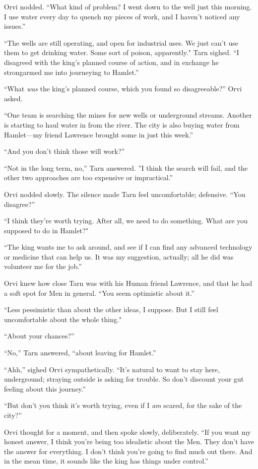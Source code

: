 Orvi nodded.  ``What kind of problem? I went down to the well just this morning.  I use water every day to quench my pieces of work, and I haven't noticed any issues.''

``The wells are still operating, and open for industrial uses.  We just can't use them to get drinking water.  Some sort of poison, apparently."  Tarn sighed.  ``I disagreed with the king's planned course of action, and in exchange he strongarmed me into journeying to Hamlet.''

``What \emph{was} the king's planned course, which you found so disagreeable?'' Orvi asked.

``One team is searching the mines for new wells or underground streams.  Another is starting to haul water in from the river.  The city is also buying water from Hamlet---my friend Lawrence brought some in just this week.''

``And you don't think those will work?''

``Not in the long term, no,'' Tarn answered.  ''I think the search will fail, and the other two approaches are too expensive or impractical.''

Orvi nodded slowly.  The silence made Tarn feel uncomfortable; defensive.  ``You disagree?''

``I think they're worth trying.  After all, we need to do something.  What are you supposed to do in Hamlet?"

``The king wants me to ask around, and see if I can find any advanced technology or medicine that can help us.  It was my suggestion, actually; all he did was volunteer me for the job.''

Orvi knew how close Tarn was with his Human friend Lawrence, and that he had a soft spot for Men in general.  ``You seem optimistic about it.''

``Less pessimistic than about the other ideas, I suppose.  But I still feel uncomfortable about the whole thing."

``About your chances?''

``No,'' Tarn answered, ``about leaving for Hamlet.''

``Ahh,'' sighed Orvi sympathetically.  ``It's natural to want to stay here, underground; straying outside is asking for trouble.  So don't discount your gut feeling about this journey.''

``But don't you think it's worth trying, even if I \emph{am} scared, for the sake of the city?''

Orvi thought for a moment, and then spoke slowly, deliberately.  ``If you want my honest answer, I think you're being too idealistic about the Men.  They don't have the answer for everything.  I don't think you're going to find much out there.  And in the mean time, it sounds like the king has things under control.''

